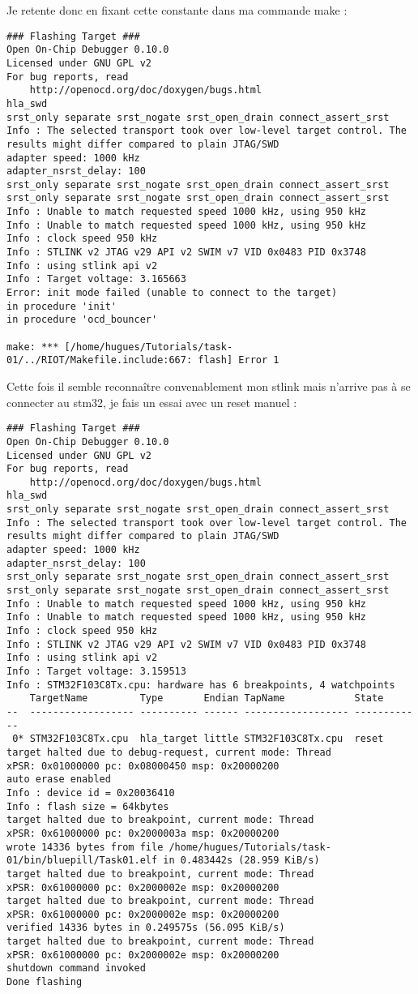 Je retente donc en fixant cette constante dans ma commande make :
{\scriptsize
\begin{verbatim}
### Flashing Target ###
Open On-Chip Debugger 0.10.0
Licensed under GNU GPL v2
For bug reports, read
	http://openocd.org/doc/doxygen/bugs.html
hla_swd
srst_only separate srst_nogate srst_open_drain connect_assert_srst
Info : The selected transport took over low-level target control. The results might differ compared to plain JTAG/SWD
adapter speed: 1000 kHz
adapter_nsrst_delay: 100
srst_only separate srst_nogate srst_open_drain connect_assert_srst
srst_only separate srst_nogate srst_open_drain connect_assert_srst
Info : Unable to match requested speed 1000 kHz, using 950 kHz
Info : Unable to match requested speed 1000 kHz, using 950 kHz
Info : clock speed 950 kHz
Info : STLINK v2 JTAG v29 API v2 SWIM v7 VID 0x0483 PID 0x3748
Info : using stlink api v2
Info : Target voltage: 3.165663
Error: init mode failed (unable to connect to the target)
in procedure 'init' 
in procedure 'ocd_bouncer'

make: *** [/home/hugues/Tutorials/task-01/../RIOT/Makefile.include:667: flash] Error 1
\end{verbatim}
}
Cette fois il semble reconnaître convenablement mon stlink mais n'arrive pas à se
connecter au stm32, je fais un essai avec un reset manuel :
{\scriptsize
\begin{verbatim}
### Flashing Target ###
Open On-Chip Debugger 0.10.0
Licensed under GNU GPL v2
For bug reports, read
	http://openocd.org/doc/doxygen/bugs.html
hla_swd
srst_only separate srst_nogate srst_open_drain connect_assert_srst
Info : The selected transport took over low-level target control. The results might differ compared to plain JTAG/SWD
adapter speed: 1000 kHz
adapter_nsrst_delay: 100
srst_only separate srst_nogate srst_open_drain connect_assert_srst
srst_only separate srst_nogate srst_open_drain connect_assert_srst
Info : Unable to match requested speed 1000 kHz, using 950 kHz
Info : Unable to match requested speed 1000 kHz, using 950 kHz
Info : clock speed 950 kHz
Info : STLINK v2 JTAG v29 API v2 SWIM v7 VID 0x0483 PID 0x3748
Info : using stlink api v2
Info : Target voltage: 3.159513
Info : STM32F103C8Tx.cpu: hardware has 6 breakpoints, 4 watchpoints
    TargetName         Type       Endian TapName            State       
--  ------------------ ---------- ------ ------------------ ------------
 0* STM32F103C8Tx.cpu  hla_target little STM32F103C8Tx.cpu  reset
target halted due to debug-request, current mode: Thread 
xPSR: 0x01000000 pc: 0x08000450 msp: 0x20000200
auto erase enabled
Info : device id = 0x20036410
Info : flash size = 64kbytes
target halted due to breakpoint, current mode: Thread 
xPSR: 0x61000000 pc: 0x2000003a msp: 0x20000200
wrote 14336 bytes from file /home/hugues/Tutorials/task-01/bin/bluepill/Task01.elf in 0.483442s (28.959 KiB/s)
target halted due to breakpoint, current mode: Thread 
xPSR: 0x61000000 pc: 0x2000002e msp: 0x20000200
target halted due to breakpoint, current mode: Thread 
xPSR: 0x61000000 pc: 0x2000002e msp: 0x20000200
verified 14336 bytes in 0.249575s (56.095 KiB/s)
target halted due to breakpoint, current mode: Thread 
xPSR: 0x61000000 pc: 0x2000002e msp: 0x20000200
shutdown command invoked
Done flashing
\end{verbatim}
}
